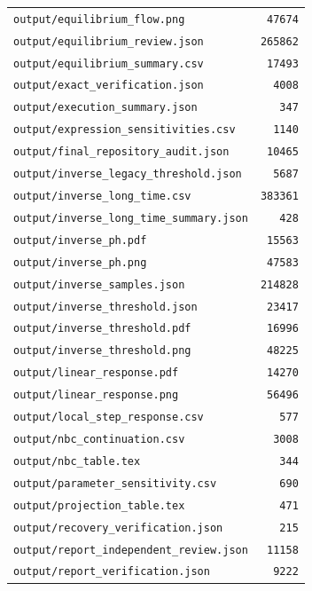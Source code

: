 \begin{longtable}{p{.78\linewidth}r}
\nolinkurl{output/equilibrium_flow.png} & \texttt{47674} \\
\nolinkurl{output/equilibrium_review.json} & \texttt{265862} \\
\nolinkurl{output/equilibrium_summary.csv} & \texttt{17493} \\
\nolinkurl{output/exact_verification.json} & \texttt{4008} \\
\nolinkurl{output/execution_summary.json} & \texttt{347} \\
\nolinkurl{output/expression_sensitivities.csv} & \texttt{1140} \\
\nolinkurl{output/final_repository_audit.json} & \texttt{10465} \\
\nolinkurl{output/inverse_legacy_threshold.json} & \texttt{5687} \\
\nolinkurl{output/inverse_long_time.csv} & \texttt{383361} \\
\nolinkurl{output/inverse_long_time_summary.json} & \texttt{428} \\
\nolinkurl{output/inverse_ph.pdf} & \texttt{15563} \\
\nolinkurl{output/inverse_ph.png} & \texttt{47583} \\
\nolinkurl{output/inverse_samples.json} & \texttt{214828} \\
\nolinkurl{output/inverse_threshold.json} & \texttt{23417} \\
\nolinkurl{output/inverse_threshold.pdf} & \texttt{16996} \\
\nolinkurl{output/inverse_threshold.png} & \texttt{48225} \\
\nolinkurl{output/linear_response.pdf} & \texttt{14270} \\
\nolinkurl{output/linear_response.png} & \texttt{56496} \\
\nolinkurl{output/local_step_response.csv} & \texttt{577} \\
\nolinkurl{output/nbc_continuation.csv} & \texttt{3008} \\
\nolinkurl{output/nbc_table.tex} & \texttt{344} \\
\nolinkurl{output/parameter_sensitivity.csv} & \texttt{690} \\
\nolinkurl{output/projection_table.tex} & \texttt{471} \\
\nolinkurl{output/recovery_verification.json} & \texttt{215} \\
\nolinkurl{output/report_independent_review.json} & \texttt{11158} \\
\nolinkurl{output/report_verification.json} & \texttt{9222} \\

\end{longtable}

